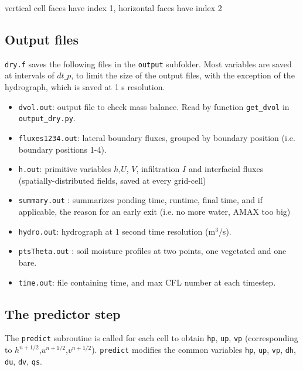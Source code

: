 \documentclass{article}
\newcommand{\code}[1]{\texttt{#1}}
\begin{document}
%
%


vertical cell faces have index 1,
horizontal faces have index 2


\subsection{Output files}

 \code{dry.f} saves the following  files in the \code{output} subfolder.
Most variables are saved at intervals of  $dt\_p$, to limit the size of the output files, with the exception of the hydrograph, which is saved at 1 s resolution.   
\begin{itemize}
	\item \code{dvol.out}:  output file to check mass balance. Read by function \code{get\_dvol} in \code{output\_dry.py}.
	\item \code{fluxes1234.out}: lateral boundary fluxes, grouped by boundary  position (i.e. boundary positions 1-4).  
	\item \code{h.out}: primitive variables $h$,$U$, $V$, infiltration $I$ and interfacial fluxes (spatially-distributed fields, saved at every grid-cell)
	\item \code{summary.out} : summarizes ponding time, runtime, final time, and if applicable, the reason for an early exit (i.e. no more water, AMAX too big) 
	\item \code{hydro.out}: hydrograph at 1 second time resolution (m$^3$/s).  
	\item \code{ptsTheta.out} : soil moisture profiles at two points, one vegetated and one bare. 
	\item \code{time.out}: file containing time, and max CFL number at each timestep.
\end{itemize}


\subsection{The predictor step}

The \code{predict} subroutine is called for each cell to obtain \code{hp}, \code{up},  \code{vp} (corresponding to $h^{n+1/2}$,$u^{n+1/2}$,$v^{n+1/2}$).   \code{predict}  modifies the common variables  \code{hp}, \code{up},  \code{vp}, \code{dh}, \code{du}, \code{dv}, \code{qs}.
\end{document}
